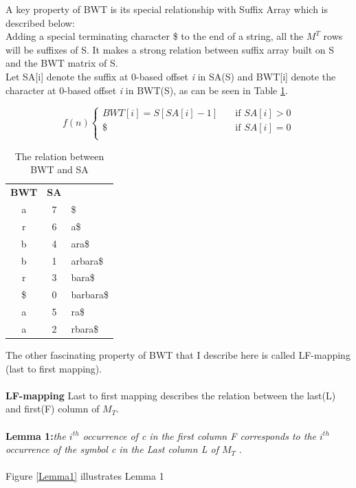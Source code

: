 \documentclass[11pt,a4paper]{report}
\begin{document}
A key property of BWT is its special relationship with Suffix Array which is described below: \\
Adding a special terminating character \$ to the end of a string, all the $M^T$ rows will be suffixes of S. 
It makes a strong relation between suffix array built on S and the BWT matrix of S.\\
Let SA[i] denote the suffix at 0-based offset \emph{i} in SA(S) and BWT[i] denote the character 
at 0-based offset \emph{i} in BWT(S)\cite{bwt}, as can be seen in Table \ref{BWT&SA}.




\[ f(n)
\begin{cases}
    BWT[i]=S[SA[i]-1]   & \quad \text{if } SA[i] > 0\\
    \$  & \quad \text{if } SA[i]= 0\\
\end{cases}
\]


\begin{table}[h]
\centering
  \begin{tabular}{ c c l}
  \textbf{  BWT} & \textbf{SA } & \\ 
       a 	&	 7	 &   \$\\  
       r 	&	 6	 &	 a\$ \\
       b 	&	 4	 &	 ara\$ \\
       b 	&	 1	 &	 arbara\$ \\
       r  	&	 3	 &	 bara\$ \\
      \$ 	&	 0	 &	 barbara\$ \\
       a 	&	 5	 &	 ra\$ \\
       a 	&	 2	 &	 rbara\$ \\

  \end{tabular}
  
\caption{The relation between BWT and SA}
\label{BWT&SA}
\end{table}


The other fascinating property of BWT that I describe here is called LF-mapping (last to first mapping).\\\\
\textbf{LF-mapping}  Last to first mapping describes the relation between the last(L) and first(F) column of $M_{T}$\cite{bwt}.\\\\
\textbf{Lemma 1:}\emph{the $i^{th}$ occurrence of c in the first column \emph{F} corresponds to the $i^{th}$ occurrence of the symbol c in the Last column \emph{L} of $M_{T}$} \cite{bwt}.\\\\
Figure \ref{Lemma1} illustrates Lemma 1\\
\end{document}
